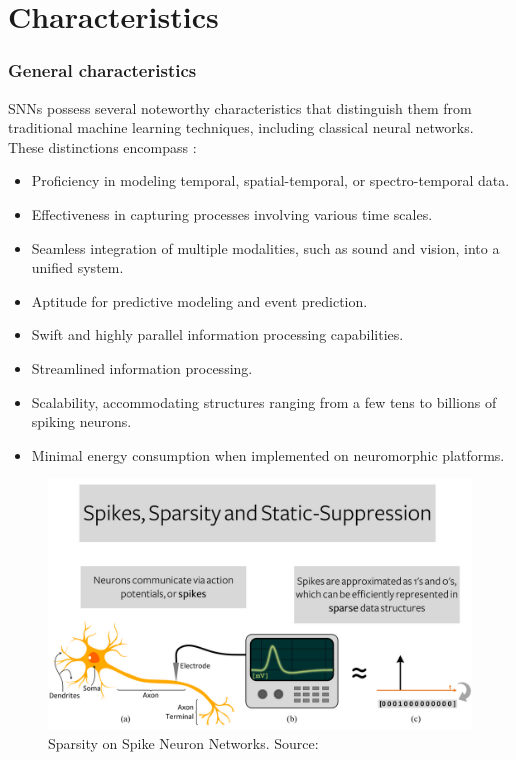 \section{Characteristics}
\begin{frame}[allowframebreaks]
	\frametitle{General characteristics}
	
	\par SNNs possess several noteworthy characteristics that distinguish them from traditional machine learning techniques, including classical neural networks. These distinctions encompass \cite{kasabov2019time}:
	
	\begin{itemize}
		\item Proficiency in modeling temporal, spatial-temporal, or spectro-temporal data.
		\item Effectiveness in capturing processes involving various time scales.
		\item Seamless integration of multiple modalities, such as sound and vision, into a unified system.
		\item Aptitude for predictive modeling and event prediction.
		\item Swift and highly parallel information processing capabilities.
		\item Streamlined information processing.
		\item Scalability, accommodating structures ranging from a few tens to billions of spiking neurons.
		\item Minimal energy consumption when implemented on neuromorphic platforms.
	\end{itemize}

	\begin{figure}
		\centering
		\includegraphics[width=0.7\linewidth]{images/spikesSparsityStaticSupress}
		\caption{Sparsity on Spike Neuron Networks. Source: \cite{10242251}}
		\label{fig:spikessparsitystaticsupress}
	\end{figure}
	

\end{frame}

